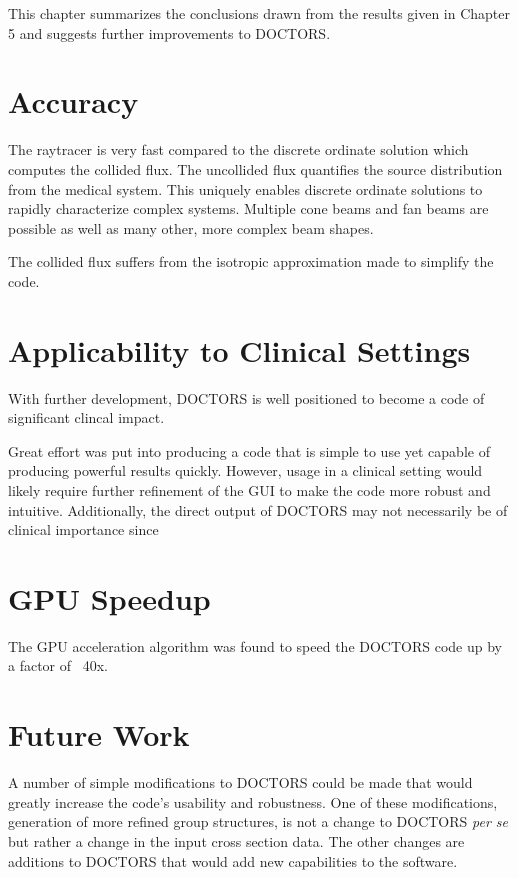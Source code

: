 
This chapter summarizes the conclusions drawn from the results given in Chapter 5 and suggests further improvements to DOCTORS.

\section{Accuracy}

The raytracer is very fast compared to the discrete ordinate solution which computes the collided flux. The uncollided flux quantifies the source distribution from the medical system. This uniquely enables discrete ordinate solutions to rapidly characterize complex systems. Multiple cone beams and fan beams are possible as well as many other, more complex beam shapes.

The collided flux suffers from the isotropic approximation made to simplify the code.

\section{Applicability to Clinical Settings}
With further development, DOCTORS is well positioned to become a code of significant clincal impact.

Great effort was put into producing a code that is simple to use yet capable of producing powerful results quickly. However, usage in a clinical setting would likely require further refinement of the GUI to make the code more robust and intuitive. Additionally, the direct output of DOCTORS may not necessarily be of clinical importance since 

\section{GPU Speedup}

The GPU acceleration algorithm was found to speed the DOCTORS code up by a factor of ~40x.

\section{Future Work}

A number of simple modifications to DOCTORS could be made that would greatly increase the code's usability and robustness. One of these modifications, generation of more refined group structures, is not a change to DOCTORS \textit{per se} but rather a change in the input cross section data. The other changes are additions to DOCTORS that would add new capabilities to the software.

